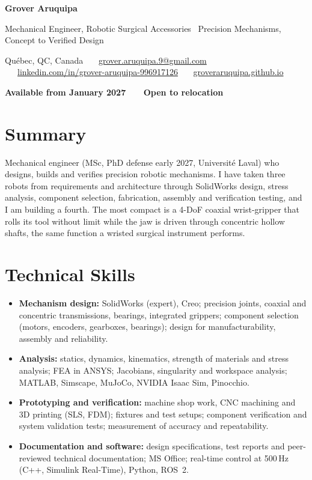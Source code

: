 \documentclass[10pt,letterpaper]{article}
\begin{document}
{\LARGE\bfseries Grover Aruquipa}\par\vspace{2pt}
{\large Mechanical Engineer, Robotic Surgical Accessories \textbar\ Precision Mechanisms, Concept to Verified Design}\par\vspace{3pt}
{\small Qu\'ebec, QC, Canada \ \textbullet\ \
\href{mailto:grover.aruquipa.9@gmail.com}{grover.aruquipa.9@gmail.com} \ \textbullet\ \
\href{https://www.linkedin.com/in/grover-aruquipa-996917126}{linkedin.com/in/grover-aruquipa-996917126} \ \textbullet\ \
\href{https://groveraruquipa.github.io}{groveraruquipa.github.io}}\par\vspace{1pt}
{\small\bfseries Available from January 2027 \ \textbullet\ \ Open to relocation}\par


\section{Summary}
Mechanical engineer (MSc, PhD defense early 2027, Universit\'e Laval) who designs, builds and verifies precision robotic
mechanisms. I have taken three robots from requirements and architecture through SolidWorks design, stress analysis,
component selection, fabrication, assembly and verification testing, and I am building a fourth. The most compact is a
4-DoF coaxial wrist-gripper that rolls its tool without limit while the jaw is driven through concentric hollow shafts,
the same function a wristed surgical instrument performs.

\section{Technical Skills}
\begin{itemize}
\item \textbf{Mechanism design:} SolidWorks (expert), Creo; precision joints, coaxial and concentric transmissions,
bearings, integrated grippers; component selection (motors, encoders, gearboxes, bearings); design for manufacturability,
assembly and reliability.
\item \textbf{Analysis:} statics, dynamics, kinematics, strength of materials and stress analysis; FEA in ANSYS; Jacobians,
singularity and workspace analysis; MATLAB, Simscape, MuJoCo, NVIDIA Isaac Sim, Pinocchio.
\item \textbf{Prototyping and verification:} machine shop work, CNC machining and 3D printing (SLS, FDM); fixtures and test
setups; component verification and system validation tests; measurement of accuracy and repeatability.
\item \textbf{Documentation and software:} design specifications, test reports and peer-reviewed technical documentation;
MS Office; real-time control at 500\,Hz (C++, Simulink Real-Time), Python, ROS~2.
\end{itemize}
\end{document}
